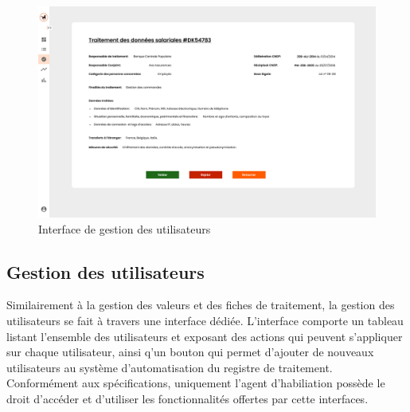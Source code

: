 \begin{figure}[H]
    \centering
    \includegraphics[height=.88\textwidth, angle=90]{images/guis/validation.png}
    \caption{Interface de gestion des utilisateurs}
\end{figure}

\clearpage

\subsection{Gestion des utilisateurs}

Similairement à la gestion des valeurs et des fiches de traitement, la gestion des utilisateurs se fait à travers une interface dédiée. L'interface comporte un tableau listant l'ensemble des utilisateurs et exposant des actions qui peuvent s'appliquer sur chaque utilisateur, ainsi q'un bouton qui permet d'ajouter de nouveaux utilisateurs au système d'automatisation du registre de traitement. \\

\noindent Conformément aux spécifications, uniquement l'agent d'habiliation possède le droit d'accéder et d'utiliser les fonctionnalités offertes par cette interfaces. \\

